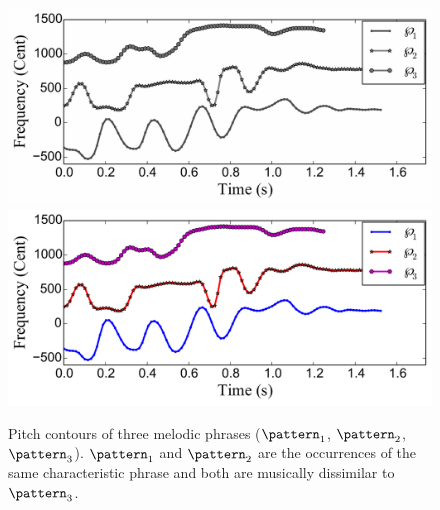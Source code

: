 \begin{figure}
	\begin{center}
		\ifdefined\PRINTVER
			\includegraphics[width=\figSizeEighty]{ch06_patterns/figures/ImprovingSimilarity/CarnaticComplexityExample_BW.pdf}
		\else
			\includegraphics[width=\figSizeEightyFive]{ch06_patterns/figures/ImprovingSimilarity/CarnaticComplexityExample.pdf}
		\fi		
	\end{center}
	\caption[Illustration of an erroneous case of melodic similarity in Carnatic music]{Pitch contours of three melodic phrases ($\pattern_1$, $\pattern_2$, $\pattern_3$). $\pattern_1$ and $\pattern_2$ are the occurrences of the same characteristic phrase and both are musically dissimilar to $\pattern_3$.} 
	\label{fig:carnaticComplexityExample}
\end{figure}

